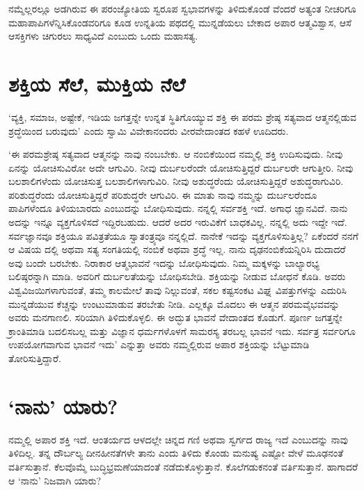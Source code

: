ನಮ್ಮೆಲ್ಲರಲ್ಲೂ ಅಡಗಿರುವ ಈ ಪರಂಜ್ಯೋತಿಯ ಸ್ವರೂಪ ಸ್ವಭಾವಗಳನ್ನು ತಿಳಿದುಕೊಂಡೆ ವೆಂದರೆ ಅತ್ಯಂತ ನೀಚರಿಗೂ ಮಹಾಪಾಪಿಗಳೆನ್ನಿಸಿಕೊಂಡವರಿಗೂ ಕೂಡ ಉನ್ನತಿಯ ಪಥದಲ್ಲಿ ಮುನ್ನಡೆಯಲು ಬೇಕಾದ ಅಪಾರ ಆತ್ಮವಿಶ್ವಾಸ, ಆಸೆ ಆಸಕ್ತಿಗಳು ಚಿಗುರಲು ಸಾಧ್ಯವಿದೆ ಎಂಬುದು ಒಂದು ಮಹಾಸತ್ಯ.


\section*{ಶಕ್ತಿಯ ಸೆಲೆ, ಮುಕ್ತಿಯ ನೆಲೆ}


‘ವ್ಯಕ್ತಿ, ಸಮಾಜ, ಅಷ್ಟೇಕೆ, ಇಡಿಯ ಜಗತ್ತನ್ನೇ ಉನ್ನತ ಸ್ಥಿತಿಗೊಯ್ಯುವ ಶಕ್ತಿ ಈ ಪರಮ ಶ್ರೇಷ್ಠ ಸತ್ಯವಾದ ಆತ್ಮನಲ್ಲಿಡುವ ಶ್ರದ್ಧೆಯಿಂದ ಬರುವುದು’ ಎಂದು ಸ್ವಾಮಿ ವಿವೇಕಾನಂದರು ವೀರವೇದಾಂತದ ಕಹಳೆ ಊದಿದರು.

‘ಈ ಪರಮಶ್ರೇಷ್ಠ ಸತ್ಯವಾದ ಆತ್ಮನನ್ನು ನಾವು ನಂಬಬೇಕು. ಆ ನಂಬಿಕೆಯಿಂದ ನಮ್ಮಲ್ಲಿ ಶಕ್ತಿ ಉದಿಸುವುದು. ನೀವು ಏನನ್ನು ಯೋಚಿಸುವಿರೋ ಅದೇ ಆಗುವಿರಿ. ನೀವು ದುರ್ಬಲರೆಂದೇ ಯೋಚಿಸುತ್ತಿದ್ದರೆ ದುರ್ಬಲರೇ ಆಗುತ್ತೀರಿ. ನೀವು ಬಲಶಾಲಿಗಳೆಂದು ಯೋಚಿಸುತ್ತ ಬಲಶಾಲಿ\-ಗಳಾ\-ಗುವಿರಿ. ನೀವು ಅಶುದ್ಧರೆಂದು ಯೋಚಿಸುತ್ತಿದ್ದರೆ ಅಶುದ್ಧರಾಗುವಿರಿ. ಪರಿಶುದ್ಧರೆಂದು ಯೋಚಿಸುತ್ತಿದ್ದರೆ ಪರಿಶುದ್ಧರೇ ಆಗುವಿರಿ. ಈ ಮಾತು ನಾವು ನಮ್ಮನ್ನು ದುರ್ಬಲರೆಂದೂ ಪಾಪಿಗಳೆಂದೂ ತಿಳಿಯಬಾರದು ಎಂಬುದನ್ನು ಬೋಧಿಸುವುದು. ನನ್ನಲ್ಲಿ ಸರ್ವಶಕ್ತಿ ಇದೆ. ಅಗಾಧ ಜ್ಞಾನವಿದೆ. ನಾನು ಅದನ್ನು ಇನ್ನೂ ವ್ಯಕ್ತಗೊಳಿಸದೆ ಇದ್ದಿರಬಹುದು. ಆದರೆ ಅದರ ಇರುವಿಕೆಗೆ ಬಾಧಕವಿಲ್ಲ. ನನ್ನಲ್ಲಿ ಅದು ಇದ್ದೇ ಇದೆ. ಸರ್ವಜ್ಞಾನವೂ ಶಕ್ತಿಯೂ ಪವಿತ್ರತೆಯೂ ಸ್ವಾತಂತ್ರ್ಯವೂ ನನ್ನಲ್ಲಿದೆ. ನಾನೇಕೆ ಇದನ್ನು ವ್ಯಕ್ತಗೊಳಿಸುತ್ತಿಲ್ಲ? ಏಕೆಂದರೆ ನನಗೆ ಆ ವಿಷಯ ದಲ್ಲಿ ಅಥವಾ ಸತ್ಯ ಸಂಗತಿಯಲ್ಲಿ ನಂಬಿಕೆ ಅಥವಾ ಶ್ರದ್ಧೆ ಇಲ್ಲ. ನಾನು ದೃಢನಂಬಿಕೆಯನ್ನಿರಿಸಿ ದುದಾದರೆ ಅವು ಬಂದೇ ಬರಬೇಕು. ನಿರಾಕಾರ ಆತ್ಮಭಾವನೆ ಇದನ್ನು ಬೋಧಿಸುವುದು. ನಿಮ್ಮ ಮಕ್ಕಳನ್ನು ಬಾಲ್ಯಾರಭ್ಯ ಬಲಿಷ್ಠರನ್ನಾಗಿ ಮಾಡಿ. ಅವರಿಗೆ ದುರ್ಬಲತೆಯನ್ನು ಬೋಧಿಸಬೇಡಿ. ಶಕ್ತಿಯನ್ನು ನೀಡುವ ಬೋಧನೆ ಕೊಡಿ. ಅವರು ವಿಶ್ವವಿಜಯಿಗಳಾಗುವಂತೆ, ತಮ್ಮ ಕಾಲಮೇಲೆ ತಾವು ನಿಲ್ಲುವಂತೆ, ಸಕಲ ಕಷ್ಟಸಂಕಟ ವಿಘ್ನ ವಿಪತ್ತುಗಳನ್ನು ಎದುರಿಸಿ ಮುನ್ನಡೆಯುವ ಕೆಚ್ಚನ್ನು ಉಂಟುಮಾಡುವ ತರಬೇತು ನೀಡಿ. ಎಲ್ಲಕ್ಕೂ ಮೊದಲು ಈ ಆತ್ಮನ ಪರಮವೈಭವವನ್ನು ಅವರು ಮನಗಾಣಲಿ. ಸರಿಯಾಗಿ ತಿಳಿದುಕೊಳ್ಳಲಿ. ಈ ಅದ್ಭುತ ಭಾವನೆ ವೇದಾಂತದ ಕೊಡುಗೆ. ಪೂರ್ಣ ಜಗತ್ತನ್ನೇ ಕ್ರಾಂತಿಮಾಡಿ ಬದಲಿಸಬಲ್ಲ ಮತ್ತು ವಿಜ್ಞಾನ ಧರ್ಮಗಳೊಳಗೆ ಸಾಮರಸ್ಯ ತರಬಲ್ಲ ಭಾವನೆ ಇದು. ಸರ್ವತ್ರ ಸರ್ವರಿಗೂ ಉಪಯೋಗವಾಗುವ ಭಾವನೆ ಇದು’ ಎನ್ನುತ್ತಾ ಅವರು ನಮ್ಮಲ್ಲಿರುವ ಅಪಾರ ಶಕ್ತಿಯನ್ನು ಬೆಟ್ಟುಮಾಡಿ ತೋರಿಸುತ್ತಿದ್ದಾರೆ.

\newpage


\section*{‘ನಾನು’ ಯಾರು?}


ನಮ್ಮಲ್ಲಿ ಅಪಾರ ಶಕ್ತಿ ಇದೆ. ಆಂತರ್ಯದ ಆಳದಲ್ಲೇ ಚಿನ್ನದ ಗಣಿ ಅಥವಾ ಸ್ವರ್ಗದ ರಾಜ್ಯ ಇದೆ ಎಂಬುದನ್ನು ನಾವು ತಿಳಿದಿಲ್ಲ. ತನ್ನ ದೌರ್ಬಲ್ಯ ದೀನಹೀನತೆಗಳೇ ತಾನು ಎಂದು ತಿಳಿದು ಕೊಂಡು ಮನುಷ್ಯ ಎಷ್ಟೋ ವೇಳೆ ಮೂಢನಂತೆ ವರ್ತಿಸುತ್ತಾನೆ. ಕೆಲವೊಮ್ಮೆ ಬುದ್ಧಿಭ್ರಮಣೆ\break ಯಾದಂತೆ ನಡೆದುಕೊಳ್ಳುತ್ತಾನೆ. ಕೊಲೆಗಡುಕನಂತೆ ವರ್ತಿಸುತ್ತಾನೆ. ಹಾಗಾದರೆ ಆ ‘ನಾನು’ ನಿಜವಾಗಿ ಯಾರು?

